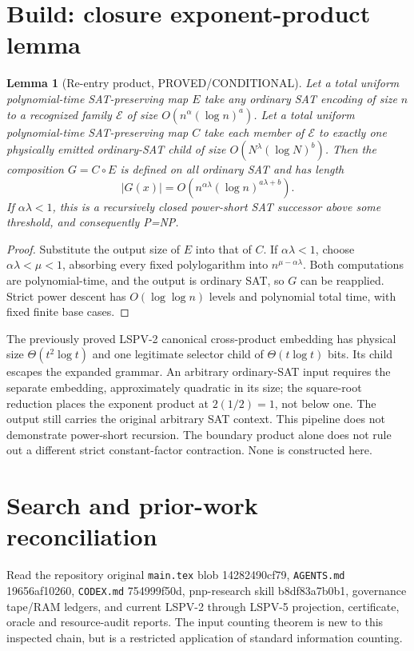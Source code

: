 \documentclass{article}
\newtheorem{lemma}[theorem]{Lemma}
\begin{document}
\section{Build: closure exponent-product lemma}
\begin{lemma}[Re-entry product, PROVED/CONDITIONAL]
Let a total uniform polynomial-time SAT-preserving map $E$ take any
ordinary SAT encoding of size $n$ to a recognized family $\mathcal E$
of size $O(n^\alpha(\log n)^a)$. Let a total uniform polynomial-time
SAT-preserving map $C$ take each member of $\mathcal E$ to exactly one
physically emitted ordinary-SAT child of size
$O(N^\lambda(\log N)^b)$. Then the composition $G=C\circ E$ is
defined on all ordinary SAT and has length
\[
 |G(x)|=O(n^{\alpha\lambda}(\log n)^{a\lambda+b}).
\]
If $\alpha\lambda<1$, this is a recursively closed power-short
SAT successor above some threshold, and consequently P=NP.
\end{lemma}
\begin{proof}
Substitute the output size of $E$ into that of $C$. If
$\alpha\lambda<1$, choose $\alpha\lambda<\mu<1$, absorbing every
fixed polylogarithm into $n^{\mu-\alpha\lambda}$. Both computations
are polynomial-time, and the output is ordinary SAT, so $G$ can
be reapplied. Strict power descent has $O(\log\log n)$ levels and
polynomial total time, with fixed finite base cases.
\end{proof}
The previously proved LSPV-2 canonical cross-product embedding has
physical size $\Theta(t^2\log t)$ and one legitimate selector child
of $\Theta(t\log t)$ bits. Its child escapes the expanded grammar.
An arbitrary ordinary-SAT input requires the separate embedding,
approximately quadratic in its size; the square-root reduction
places the exponent product at $2(1/2)=1$, not below one.
The output still carries the original arbitrary SAT context.
This pipeline does not demonstrate power-short recursion.
The boundary product alone does not rule out a different
strict constant-factor contraction. None is constructed here.

\section{Search and prior-work reconciliation}
Read the repository original \texttt{main.tex} blob 14282490cf79,
\texttt{AGENTS.md} 19656af10260, \texttt{CODEX.md}
754999f50d, pnp-research skill b8df83a7b0b1, governance
tape/RAM ledgers, and current LSPV-2 through LSPV-5
projection, certificate, oracle and resource-audit reports.
The input counting theorem is new to this inspected chain, but
is a restricted application of standard information counting.
\end{document}
